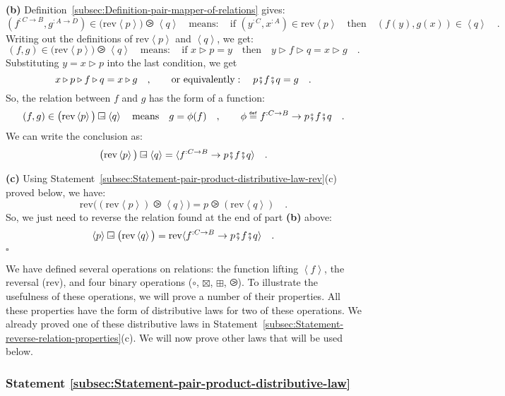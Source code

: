 \textbf{(b)} Definition~\ref{subsec:Definition-pair-mapper-of-relations}
gives:
\[
(f^{:C\rightarrow B},g^{:A\rightarrow D})\in\big(\text{rev}\left<p\right>\big)\ogreaterthan\left<q\right>\quad\text{means}:\quad\text{if }(y^{:C},x^{:A})\in\text{rev}\left<p\right>\quad\text{then}\quad(f(y),g(x))\in\left<q\right>\quad.
\]
Writing out the definitions of $\text{rev}\left<p\right>$ and $\left<q\right>$,
we get:
\[
(f,g)\in\big(\text{rev}\left<p\right>\big)\ogreaterthan\left<q\right>\quad\text{means}:\quad\text{if }x\triangleright p=y\quad\text{then}\quad y\triangleright f\triangleright q=x\triangleright g\quad.
\]
Substituting $y=x\triangleright p$ into the last condition, we get
\[
x\triangleright p\triangleright f\triangleright q=x\triangleright g\quad,\quad\quad\text{or equivalently}:\quad p\bef f\bef q=g\quad.
\]
So, the relation between $f$ and $g$ has the form of a function:
\[
(f,g)\in\big(\text{rev}\left<p\right>\big)\ogreaterthan\left<q\right>\quad\text{means}\quad g=\phi(f)\quad,\quad\quad\phi\triangleq f^{:C\rightarrow B}\rightarrow p\bef f\bef q\quad.
\]
We can write the conclusion as: 
\[
\big(\text{rev}\left<p\right>\big)\ogreaterthan\left<q\right>=\langle f^{:C\rightarrow B}\rightarrow p\bef f\bef q\rangle\quad.
\]

\textbf{(c)} Using Statement~\ref{subsec:Statement-pair-product-distributive-law-rev}(c)
proved below, we have:
\[
\text{rev}\big((\text{rev}\left<p\right>)\ogreaterthan\left<q\right>\big)=p\ogreaterthan(\text{rev}\left<q\right>)\quad.
\]
So, we just need to reverse the relation found at the end of part
\textbf{(b)} above: 
\[
\left<p\right>\ogreaterthan\big(\text{rev}\left<q\right>\big)=\text{rev}\langle f^{:C\rightarrow B}\rightarrow p\bef f\bef q\rangle\quad.
\]
 $\square$

We have defined several operations on relations: the function lifting
$\left<f\right>$, the reversal ($\text{rev}$), and four binary operations
($\circ$, $\boxtimes$, $\boxplus$, $\ogreaterthan$). To illustrate
the usefulness of these operations, we will prove a number of their
properties. All these properties have the form of distributive laws
for two of these operations. We already proved one of these distributive
laws in Statement~\ref{subsec:Statement-reverse-relation-properties}(c).
We will now prove other laws that will be used below.

\subsubsection{Statement \label{subsec:Statement-pair-product-distributive-law}\ref{subsec:Statement-pair-product-distributive-law}}

